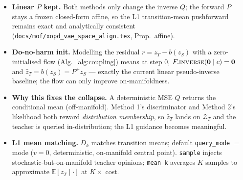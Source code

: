 \documentclass[11pt,a4paper]{article}
\newcommand{\E}{\mathbb{E}}
\newcommand{\Za}{\mathcal{Z}_{T}}
\newcommand{\zT}{z_{T}}
\newcommand{\zS}{z_{S}}
\begin{document}
\begin{itemize}[leftmargin=1.4em,itemsep=2pt]
  \item \textbf{Linear $P$ kept.} Both methods only change the inverse $Q$; the forward $P$
        stays a frozen closed-form affine, so the L1 transition-mean pushforward remains exact
        and analytically consistent (\texttt{docs/mof/xopd\_vae\_space\_align.tex}, Prop.~affine).
  \item \textbf{Do-no-harm init.} Modelling the residual $r=\zT-b(\zS)$ with a zero-initialised
        flow (Alg.~\ref{alg:coupling}) means at step $0$, $F.\textsc{inverse}(\mathbf{0}\mid c)=\mathbf{0}$
        and $\hat\zT=b(\zS)=P^{+}\zS$ --- exactly the current linear pseudo-inverse baseline; the
        flow can only improve on-manifoldness.
  \item \textbf{Why this fixes the collapse.} A deterministic MSE $Q$ returns the conditional
        mean (off-manifold). Method 1's discriminator and Method 2's likelihood both reward
        \emph{distribution membership}, so $\hat\zT$ lands on $\Za$ and the teacher is queried
        in-distribution; the L1 guidance becomes meaningful.
  \item \textbf{L1 mean matching.} $D_k$ matches transition means; default \texttt{query\_mode}
        $=$ mode ($v{=}0$, deterministic, on-manifold central point). \texttt{sample} injects
        stochastic-but-on-manifold teacher opinions; \texttt{mean\_k} averages $K$ samples to
        approximate $\E[\zT\mid\cdot]$ at $K\times$ cost.
\end{itemize}
\end{document}
